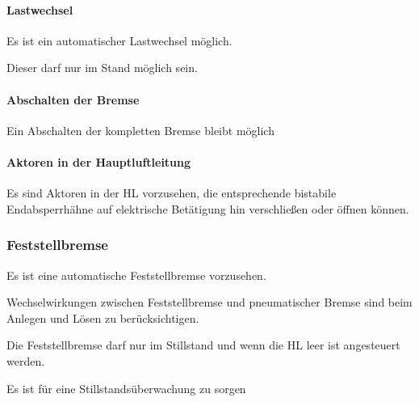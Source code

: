 \paragraph{Lastwechsel}
\begin{feat}
Es ist ein automatischer \gls{Lastwechsel} möglich.
\end{feat}
\begin{rem}[zu Anf. 19]
Dieser darf nur im Stand möglich sein.
\end{rem}

\paragraph{Abschalten der Bremse}
\begin{feat}
Ein Abschalten der kompletten Bremse bleibt möglich
\end{feat}

\paragraph{Aktoren in der Hauptluftleitung}
\begin{feat}
Es sind Aktoren in der \acrshort{HL} vorzusehen, die entsprechende bistabile Endabsperrhähne auf elektrische Betätigung hin verschließen oder öffnen können.
\end{feat}

\subsubsection{Feststellbremse}
\begin{feat}
Es ist eine automatische Feststellbremse vorzusehen.
\end{feat}
\begin{feat}
Wechselwirkungen zwischen Feststellbremse und pneumatischer Bremse sind beim Anlegen und Lösen zu berücksichtigen.
\end{feat}
\begin{rem}[zu Anf. 23]
Die Feststellbremse darf nur im Stillstand und wenn die HL leer ist angesteuert werden.
\end{rem}
\begin{feat}
Es ist für eine Stillstandsüberwachung zu sorgen
\end{feat}

